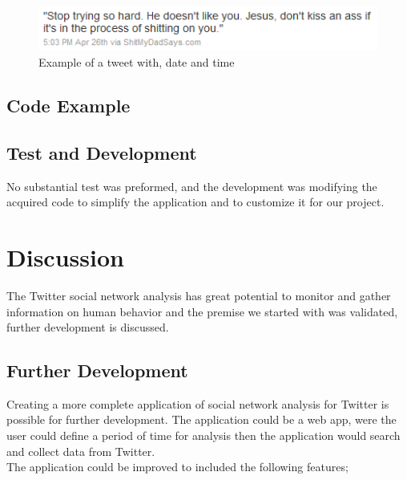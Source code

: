 \documentclass[]{article}  %
\begin{document}
\begin{figure}[h]
\centering
\includegraphics[scale=1]{tweet.png}
\caption{Example of a tweet with, date and time}
\label{figTweet}
\end{figure}

\subsection{Code Example}

\subsection{Test and Development}

No substantial test was preformed, and the development was modifying the acquired code to simplify the application and to customize it for our project. 


\section{Discussion}

The Twitter social network analysis has great potential to monitor and gather information on human behavior and the premise we started with was validated, further development is discussed. 

\subsection{Further Development}

Creating a more complete application of social network analysis for Twitter is possible for further development. The application could be a web app, were the user could define a period of time for analysis then the application would search and collect data from Twitter. \\ The application could be improved to included the following features;
\end{document}
